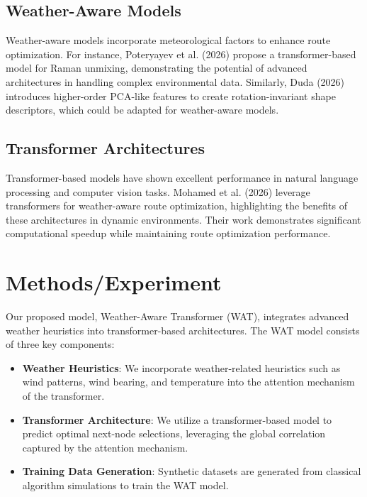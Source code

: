 \documentclass[11pt]{article}
\begin{document}
\subsection{Weather-Aware Models}

Weather-aware models incorporate meteorological factors to enhance route optimization. For instance, Poteryayev et al. (2026) propose a transformer-based model for Raman unmixing, demonstrating the potential of advanced architectures in handling complex environmental data. Similarly, Duda (2026) introduces higher-order PCA-like features to create rotation-invariant shape descriptors, which could be adapted for weather-aware models.

\subsection{Transformer Architectures}

Transformer-based models have shown excellent performance in natural language processing and computer vision tasks. Mohamed et al. (2026) leverage transformers for weather-aware route optimization, highlighting the benefits of these architectures in dynamic environments. Their work demonstrates significant computational speedup while maintaining route optimization performance.

\section{Methods/Experiment}

Our proposed model, Weather-Aware Transformer (WAT), integrates advanced weather heuristics into transformer-based architectures. The WAT model consists of three key components:

\begin{itemize}
  \item \textbf{Weather Heuristics}: We incorporate weather-related heuristics such as wind patterns, wind bearing, and temperature into the attention mechanism of the transformer.
  \item \textbf{Transformer Architecture}: We utilize a transformer-based model to predict optimal next-node selections, leveraging the global correlation captured by the attention mechanism.
  \item \textbf{Training Data Generation}: Synthetic datasets are generated from classical algorithm simulations to train the WAT model.
\end{itemize}
\end{document}
